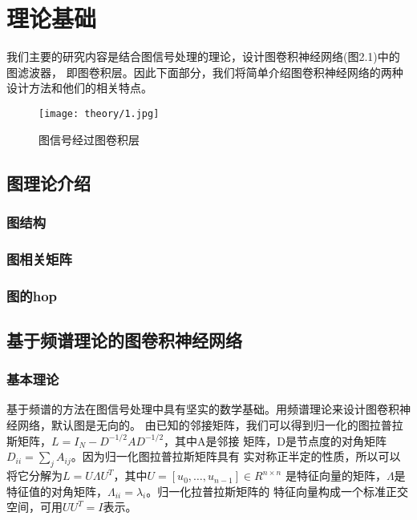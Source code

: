 \cleardoublepage

\section{理论基础}
我们主要的研究内容是结合图信号处理的理论，设计图卷积神经网络(图2.1)中的图滤波器，
即图卷积层。因此下面部分，我们将简单介绍图卷积神经网络的两种设计方法和他们的相关特点。

\begin{figure}[ht]
    \centering
    \texttt{[image: theory/1.jpg]}
    \caption{\label{2-1}图信号经过图卷积层}
\end{figure}

\subsection{图理论介绍}
\subsubsection{图结构}
\subsubsection{图相关矩阵}
\subsubsection{图的hop}

\subsection{基于频谱理论的图卷积神经网络}

\subsubsection{基本理论}
基于频谱的方法在图信号处理中具有坚实的数学基础。用频谱理论来设计图卷积神经网络，默认图是无向的。
由已知的邻接矩阵，我们可以得到归一化的图拉普拉斯矩阵，$ L=I_N-D^{-1/2}AD^{-1/2} $，其中A是邻接
矩阵，D是节点度的对角矩阵 $ D_{ii}={\sum_{j}} A_{ij} $。因为归一化图拉普拉斯矩阵具有
实对称正半定的性质，所以可以将它分解为$ L=U\Lambda U^T $，其中$ U=[u_0,\ldots,u_{n-1}]∈R^{n×n} $
是特征向量的矩阵，$ \Lambda $是特征值的对角矩阵，$\Lambda_{ii}=\lambda_{i} $。归一化拉普拉斯矩阵的
特征向量构成一个标准正交空间，可用$ UU^{T}=I $表示。

